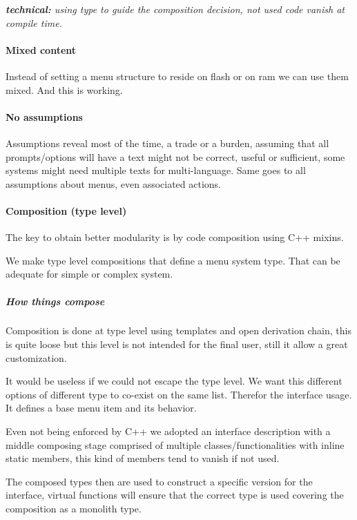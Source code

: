 {\itshape {\bfseries technical\+:} using type to guide the composition decision, not used code vanish at compile time.}

\paragraph*{Mixed content}

Instead of setting a menu structure to reside on flash or on ram we can use them mixed. And this is working.

\paragraph*{No assumptions}

Assumptions reveal most of the time, a trade or a burden, assuming that all prompts/options will have a text might not be correct, useful or sufficient, some systems might need multiple texts for multi-\/language. Same goes to all assumptions about menus, even associated actions.

\paragraph*{Composition (type level)}

The key to obtain better modularity is by code composition using C++ mixins.

We make type level compositions that define a menu system type. That can be adequate for simple or complex system.

\subparagraph*{How things compose}

Composition is done at type level using templates and open derivation chain, this is quite loose but this level is not intended for the final user, still it allow a great customization.

It would be useless if we could not escape the type level. We want this different options of different type to co-\/exist on the same list. Therefor the interface usage. It defines a base menu item and its behavior.

Even not being enforced by C++ we adopted an interface description with a middle composing stage comprised of multiple classes/functionalities with inline static members, this kind of members tend to vanish if not used.

The composed types then are used to construct a specific version for the interface, virtual functions will ensure that the correct type is used covering the composition as a monolith type.

